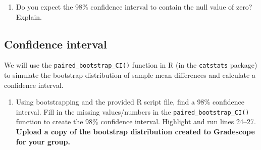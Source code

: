 \documentclass[
]{report}
\newenvironment{Shaded}{\begin{snugshade}}{\end{snugshade}}
\newcommand{\AttributeTok}[1]{\textcolor[rgb]{0.77,0.63,0.00}{#1}}
\newcommand{\CommentTok}[1]{\textcolor[rgb]{0.56,0.35,0.01}{\textit{#1}}}
\newcommand{\DecValTok}[1]{\textcolor[rgb]{0.00,0.00,0.81}{#1}}
\newcommand{\FunctionTok}[1]{\textcolor[rgb]{0.00,0.00,0.00}{#1}}
\newcommand{\NormalTok}[1]{#1}
\newcommand{\SpecialCharTok}[1]{\textcolor[rgb]{0.00,0.00,0.00}{#1}}
\providecommand{\tightlist}{%
  \setlength{\itemsep}{0pt}\setlength{\parskip}{0pt}}
\begin{document}
\vspace{0.5in}

\begin{enumerate}
\def\labelenumi{\arabic{enumi}.}
\setcounter{enumi}{13}
\tightlist
\item
  Do you expect the 98\% confidence interval to contain the null value of zero? Explain.
\end{enumerate}

\vspace{0.8in}

\hypertarget{confidence-interval-1}{%
\subsection*{Confidence interval}\label{confidence-interval-1}}

We will use the \texttt{paired\_bootstrap\_CI()} function in R (in the \texttt{catstats} package) to simulate the bootstrap distribution of sample mean differences and calculate a confidence interval.

\begin{enumerate}
\def\labelenumi{\arabic{enumi}.}
\setcounter{enumi}{14}
\tightlist
\item
  Using bootstrapping and the provided R script file, find a 98\% confidence interval. Fill in the missing values/numbers in the \texttt{paired\_bootstrap\_CI()} function to create the 98\% confidence interval. Highlight and run lines 24--27. \textbf{Upload a copy of the bootstrap distribution created to Gradescope for your group.}
\end{enumerate}

\begin{Shaded}
\end{Shaded}
\end{document}
